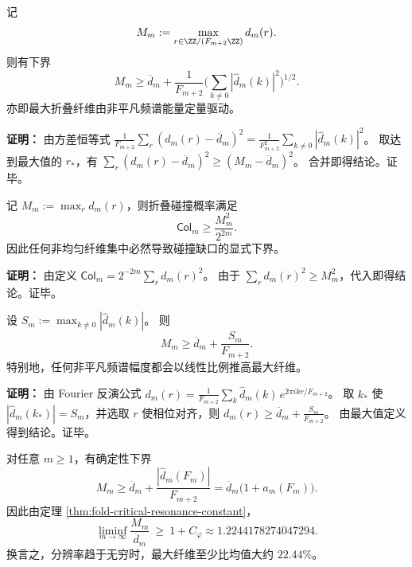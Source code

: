 \begin{theorem}[最大纤维与谱能量]
\label{thm:fold-max-fiber-spectrum}
记
\[
M_m:=\max_{r\in\ZZ/(F_{m+2}\ZZ)} d_m(r).
\]
则有下界
\[
M_m\ge \overline d_m+\frac{1}{F_{m+2}}\Biggl(\sum_{k\ne 0}|\widehat d_m(k)|^2\Biggr)^{1/2}.
\]
亦即最大折叠纤维由非平凡频谱能量定量驱动。
\end{theorem}

\textbf{证明：}
由方差恒等式
\(
\frac{1}{F_{m+2}}\sum_r(d_m(r)-\overline d_m)^2=\frac{1}{F_{m+2}^2}\sum_{k\ne 0}|\widehat d_m(k)|^2
\)。
取达到最大值的 $r_*$，有
\(
\sum_r(d_m(r)-\overline d_m)^2\ge (M_m-\overline d_m)^2
\)。
合并即得结论。证毕。

\begin{theorem}[最大纤维给出的碰撞下界]
\label{thm:fold-collision-max-fiber}
记 $M_m:=\max_r d_m(r)$，则折叠碰撞概率满足
\[
\mathsf{Col}_m\ge \frac{M_m^2}{2^{2m}}.
\]
因此任何非均匀纤维集中必然导致碰撞缺口的显式下界。
\end{theorem}

\textbf{证明：}
由定义
\(
\mathsf{Col}_m=2^{-2m}\sum_r d_m(r)^2
\)。
由于 $\sum_r d_m(r)^2\ge M_m^2$，代入即得结论。证毕。

\begin{theorem}
\label{thm:fold-max-fiber-fourier}
设
\(
S_m:=\max_{k\ne 0}|\widehat d_m(k)|
\)。
则
\[
M_m\ge \overline d_m+\frac{S_m}{F_{m+2}}.
\]
特别地，任何非平凡频谱幅度都会以线性比例推高最大纤维。
\end{theorem}

\textbf{证明：}
由 Fourier 反演公式
\(
d_m(r)=\frac{1}{F_{m+2}}\sum_k \widehat d_m(k)\,e^{2\pi i kr/F_{m+2}}
\)。
取 $k_*$ 使 $|\widehat d_m(k_*)|=S_m$，并选取 $r$ 使相位对齐，则
\(
d_m(r)\ge \overline d_m+\frac{S_m}{F_{m+2}}
\)。
由最大值定义得到结论。证毕。

\begin{corollary}\label{cor:fold-max-fiber-constant-bias}
对任意 \(m\ge 1\)，有确定性下界
\[
M_m\ge \overline d_m+\frac{|\widehat d_m(F_m)|}{F_{m+2}}
=\overline d_m\bigl(1+a_m(F_m)\bigr).
\]
因此由定理 \ref{thm:fold-critical-resonance-constant}，
\[
\liminf_{m\to\infty}\frac{M_m}{\overline d_m}\ \ge\ 1+C_\varphi
\approx 1.2244178274047294.
\]
换言之，分辨率趋于无穷时，最大纤维至少比均值大约 \(22.44\%\)。
\end{corollary}

